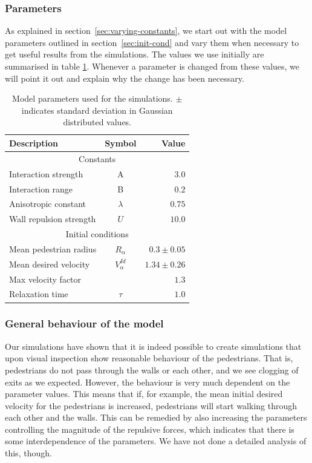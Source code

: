 \subsubsection{Parameters}
As explained in section~\ref{sec:varying-constants}, we start out with the 
model parameters outlined in section~\ref{sec:init-cond} and vary them when 
necessary to get useful results from the simulations.  The values we use 
initially are summarised in table \ref{tbl:parameter-settings}. Whenever a 
parameter is changed from these values, we will point it out and explain why 
the change has been necessary.

\begin{table}[ht]
    \begin{center}
        \begin{tabular}{l c r}
            \toprule
            \textbf{Description} & \textbf{Symbol} & \textbf{Value} \\
            \midrule
            \multicolumn{3}{c}{\textsf{Constants}}\\
            Interaction strength & A & $3.0$ \\
            Interaction range & B & $0.2$ \\
            Anisotropic constant & $\lambda$ & $0.75$ \\
            Wall repulsion strength & $U$ &  $10.0$ \\
            \midrule
            \multicolumn{3}{c}{\textsf{Initial conditions}}\\
            Mean pedestrian radius & $R_\alpha$ & $0.3 \pm 0.05$\\
            Mean desired velocity &  $V^{Id}_\alpha$ &  $1.34 \pm 0.26$ \\
            Max velocity factor &  &  $1.3$ \\
            Relaxation time & $\tau$ & $1.0$\\
            \bottomrule
        \end{tabular}
        \caption[Model parameters]{Model parameters used for the simulations.  
        $\pm$ indicates standard deviation in Gaussian distributed values.}
        \label{tbl:parameter-settings}
    \end{center}
\end{table}

\subsubsection{General behaviour of the model}
Our simulations have shown that it is indeed possible to create simulations 
that upon visual inspection show reasonable behaviour of the pedestrians. That 
is, pedestrians do not pass through the walls or each other, and we see 
clogging of exits as we expected. However, the behaviour is very much 
dependent on the parameter values. This means that if, for example, the mean 
initial desired velocity for the pedestrians is increased, pedestrians will 
start walking through each other and the walls. This can be remedied by also 
increasing the parameters controlling the magnitude of the repulsive forces, 
which indicates that there is some interdependence of the parameters. We have 
not done a detailed analysis of this, though.

